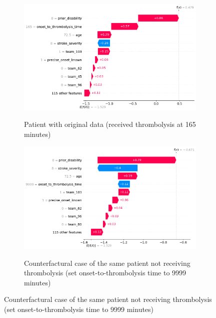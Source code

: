 \begin{figure}[h]
    \centering
    \begin{subfigure}[t]{0.5\textwidth}
    \centering
    \captionsetup{width=.8\linewidth}%
      \includegraphics[width=1\linewidth]{./images/103_xgb_7_features_1fold_binary_waterfall_plot_patient16_with_IVT.png}\\
      \caption{Patient with original data (received thrombolysis at 165 minutes)                   
                                                                                }
      \label{fig:lhs_waterfall_with_ivt}
    \end{subfigure}%
    \begin{subfigure}[t]{0.5\textwidth}
    \centering
    \captionsetup{width=.8\linewidth}%
      \includegraphics[width=1\linewidth]{./images/103_xgb_7_features_1fold_binary_waterfall_plot_patient16_without_IVT.png}\\
        \caption{Counterfactural case of the same patient not receiving thrombolysis (set onset-to-thrombolysis time to 9999 minutes)}

\end{subfigure}
\end{figure}
